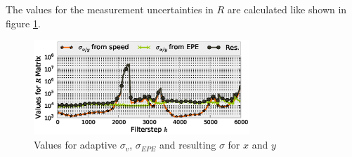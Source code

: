 \documentclass[conference]{IEEEtran}
\begin{document}
The values for the measurement uncertainties in $R$ are calculated like shown in figure \ref{adaptive-R}.

\begin{figure}[ht]
\centering
\includegraphics[width=3.2in]{images/Extended-Kalman-Filter-CTRV-Adaptive-R}
\caption{Values for adaptive $\sigma_v$, $\sigma_{EPE}$ and resulting $\sigma$ for $x$ and $y$}
\label{adaptive-R}
\end{figure}




%
%



%
%
\end{document}
